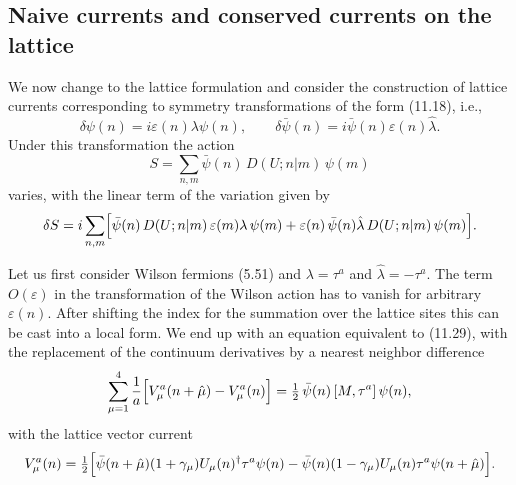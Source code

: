 \subsection{Naive currents and conserved currents on the lattice}
\label{sec:naivecurrents}
We now change to the lattice formulation and consider the construction of lattice currents corresponding to symmetry transformations of the form (11.18),
i.e.,
\begin{equation}
\delta\psi(n) = i\varepsilon(n)\lambda\psi(n) , \qquad
\delta\bar{\psi}(n) = i\bar{\psi}(n)\varepsilon(n)\hat{\lambda} .
\end{equation}
Under this transformation the action
\begin{equation}
S = \sum_{n,m} \bar{\psi}(n)\, D(U; n|m)\, \psi(m)
\end{equation}
varies, with the linear term of the variation given by
\begin{equation}
\delta S = i \sum_{n,m}
\Bigl[\bar{\psi}(n)\, D(U; n|m)\, \varepsilon(m)\lambda\, \psi(m)
+ \varepsilon(n)\,\bar{\psi}(n)\hat{\lambda}\, D(U; n|m)\, \psi(m)\Bigr] .
\end{equation}

Let us first consider Wilson fermions (5.51) and $\lambda = \tau^a$ and $\hat{\lambda} = -\tau^a$. The
term $O(\varepsilon)$ in the transformation of the Wilson action has to vanish for arbitrary $\varepsilon(n)$. After shifting the index for the summation over the lattice sites
this can be cast into a local form. We end up with an equation equivalent
to (11.29), with the replacement of the continuum derivatives by a nearest
neighbor difference
\begin{equation}
\sum_{\mu=1}^{4} \frac{1}{a}\Bigl[V_\mu^a(n + \hat{\mu}) - V_\mu^a(n)\Bigr]
= \tfrac{1}{2}\,\bar{\psi}(n)\,[M, \tau^a]\,\psi(n) ,
\end{equation}
with the lattice vector current
\begin{equation}
V_\mu^a(n) = \tfrac{1}{2} \Bigl[
\bar{\psi}(n + \hat{\mu})(1 + \gamma_\mu)U_\mu(n)^\dagger\tau^a\psi(n)
- \bar{\psi}(n)(1 - \gamma_\mu)U_\mu(n)\tau^a\psi(n + \hat{\mu})
\Bigr] .
\end{equation}

